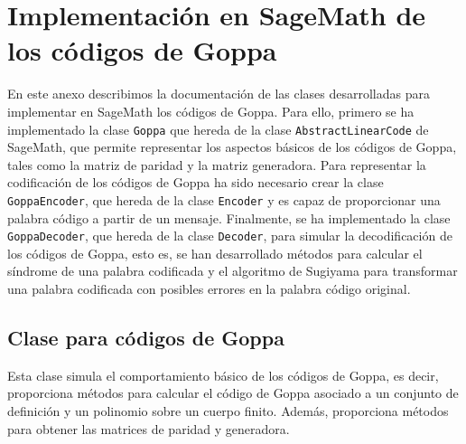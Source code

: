 \chapter[Implementación en SageMath de los códigos de Goppa]{Implementación en SageMath de los códigos de Goppa}
\label{annex:sage-Goppa}

En este anexo describimos la documentación de las clases desarrolladas para implementar en SageMath los códigos de Goppa. Para ello, primero se ha implementado la clase \texttt{Goppa} que hereda de la clase \texttt{AbstractLinearCode} de SageMath, que permite representar los aspectos básicos de los códigos de Goppa, tales como la matriz de paridad y la matriz generadora. Para representar la codificación de los códigos de Goppa ha sido necesario crear la clase \texttt{GoppaEncoder}, que hereda de la clase \texttt{Encoder} y es capaz de proporcionar una palabra código a partir de un mensaje. Finalmente, se ha implementado la clase \texttt{GoppaDecoder}, que hereda de la clase \texttt{Decoder}, para simular la decodificación de los códigos de Goppa, esto es, se han desarrollado métodos para calcular el síndrome de una palabra codificada y el algoritmo de Sugiyama para transformar una palabra codificada con posibles errores en la palabra código original.

\section{Clase para códigos de Goppa}

Esta clase simula el comportamiento básico de los códigos de Goppa, es decir, proporciona métodos para calcular el código de Goppa asociado a un conjunto de definición y un polinomio sobre un cuerpo finito. Además, proporciona métodos para obtener las matrices de paridad y generadora.

